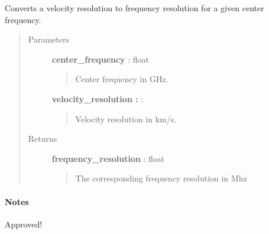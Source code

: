 \documentclass[a4paper,10pt,english]{sphinxmanual}
\begin{document}
\begin{fulllineitems}
\label{functions:astrolyze.functions.astro_functions.vel_to_freq_resolution}
Converts a velocity resolution to frequency resolution for a given
center frequency.
\begin{quote}\begin{description}
\item[{Parameters }] \leavevmode
\textbf{center\_frequency} : float
\begin{quote}

Center frequency in GHz.
\end{quote}

\textbf{velocity\_resolution :} :
\begin{quote}

Velocity resolution in km/s.
\end{quote}

\item[{Returns }] \leavevmode
\textbf{frequency\_resolution} : float
\begin{quote}

The corresponding frequency resolution in Mhz
\end{quote}

\end{description}\end{quote}
\paragraph{Notes}

Approved!

\end{fulllineitems}

\end{document}
